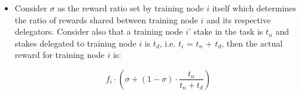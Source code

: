 \documentclass[conference]{IEEEtran}
\begin{document}
\begin{itemize}
$$f_i(g_i, t_i) = \frac{g_{i} \cdot t_i^{\alpha_t}}{\sum_{k=1}^{n} g_{k} \cdot t_k^{\alpha_t}}
$$
where $\alpha_t$ is a system parameter which determines the influence of the stake on the reward distribution, and $t_i$ the total stake amount of from the training node $i$ as well as its respective delegators.

\item Consider $\sigma$ as the reward ratio set by training node $i$  itself which determines the ratio of rewards shared between training node $i$  and its respective delegators. Consider also that a training node $i$' stake in the task is $t_n$ and stakes delegated to training node $i$ is $t_d$, i.e.  $t_i$ = $t_n$ + $t_d$, then the actual reward for training node $i$ is:

$$f_i \cdot \left(\sigma + (1-\sigma) \cdot \frac{t_n}{t_n+t_d}\right)$$

\end{itemize}
\end{document}
